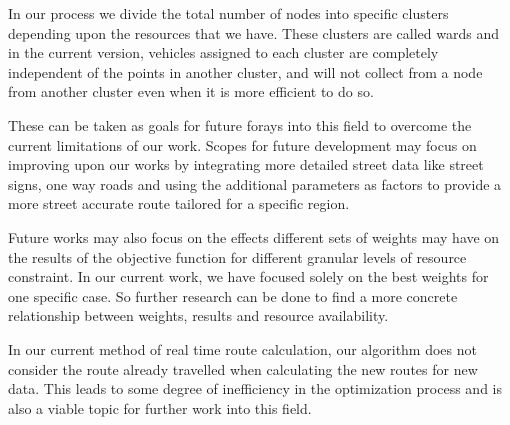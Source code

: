 \documentclass[12pt]{article}
\begin{document}
In our process we divide the total number of nodes into specific clusters depending upon the resources that we have. These clusters are called wards and in the current version, vehicles assigned to each cluster are completely independent of the points in another cluster, and will not collect from a node from another cluster even when it is more efficient to do so. 

These can be taken as goals for future forays into this field to overcome the current limitations of our work. Scopes for future development may focus on improving upon our works by integrating more detailed street data like street signs, one way roads and using the additional parameters as factors to provide a more street accurate route tailored for a specific region.

Future works may also focus on the effects different sets of weights may have on the results of the objective function for different granular levels of resource constraint. In our current work, we have focused solely on the best weights for one specific case. So further research can be done to find a more concrete relationship between weights, results and resource availability. 

In our current method of real time route calculation, our algorithm does not consider the route already travelled when calculating the new routes for new data. This leads to some degree of inefficiency in the optimization process and is also a viable topic for further work into this field.
\end{document}

